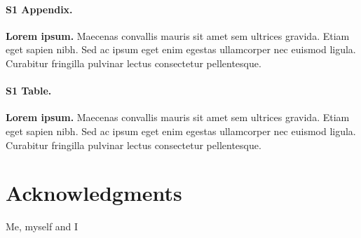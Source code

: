 \documentclass[10pt,letterpaper]{article}
\begin{document}
\paragraph*{S1 Appendix.}
\label{S1_Appendix}
{\bf Lorem ipsum.} Maecenas convallis mauris sit amet sem ultrices gravida. Etiam eget sapien nibh. Sed ac ipsum eget enim egestas ullamcorper nec euismod ligula. Curabitur fringilla pulvinar lectus consectetur pellentesque.

\paragraph*{S1 Table.}
\label{S1_Table}
{\bf Lorem ipsum.} Maecenas convallis mauris sit amet sem ultrices gravida. Etiam eget sapien nibh. Sed ac ipsum eget enim egestas ullamcorper nec euismod ligula. Curabitur fringilla pulvinar lectus consectetur pellentesque.

\section*{Acknowledgments}
Me, myself and I

\nolinenumbers
\end{document}
